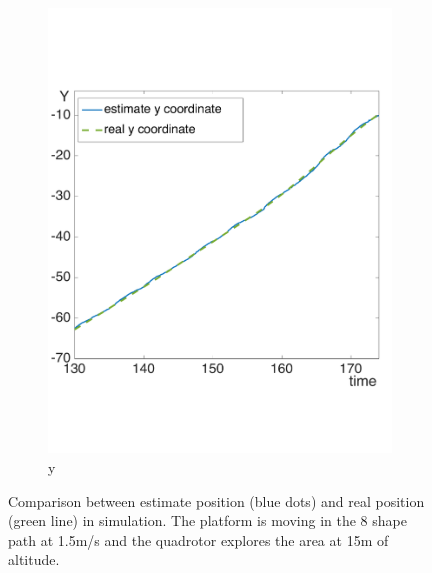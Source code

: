 \begin{figure}[!htbp]
\begin{subfigure}[b]{0.4\textwidth}
        \includegraphics[width=\textwidth]{img/high_altitude_error_y.pdf}
        \caption{y}
        \label{fig:two}
   \end{subfigure}
  \caption{Comparison between estimate position (blue dots) and real position (green line) in simulation. The platform is moving in the 8 shape path at 1.5m/s and the quadrotor explores the area at 15m of altitude.}
  \label{fig:ekf_high_altitude_comparison}
\end{figure} 

